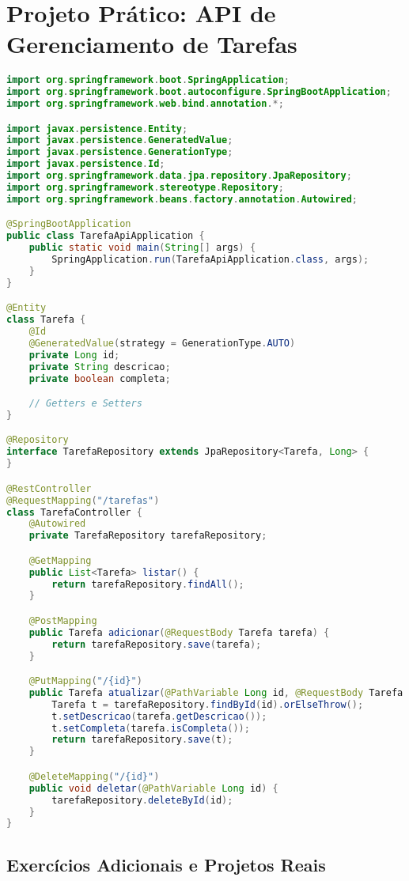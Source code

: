 \documentclass[a4paper,12pt]{book}
\begin{document}
\section{Projeto Prático: API de Gerenciamento de Tarefas}
\begin{lstlisting}[language=Java]
import org.springframework.boot.SpringApplication;
import org.springframework.boot.autoconfigure.SpringBootApplication;
import org.springframework.web.bind.annotation.*;

import javax.persistence.Entity;
import javax.persistence.GeneratedValue;
import javax.persistence.GenerationType;
import javax.persistence.Id;
import org.springframework.data.jpa.repository.JpaRepository;
import org.springframework.stereotype.Repository;
import org.springframework.beans.factory.annotation.Autowired;

@SpringBootApplication
public class TarefaApiApplication {
    public static void main(String[] args) {
        SpringApplication.run(TarefaApiApplication.class, args);
    }
}

@Entity
class Tarefa {
    @Id
    @GeneratedValue(strategy = GenerationType.AUTO)
    private Long id;
    private String descricao;
    private boolean completa;

    // Getters e Setters
}

@Repository
interface TarefaRepository extends JpaRepository<Tarefa, Long> {
}

@RestController
@RequestMapping("/tarefas")
class TarefaController {
    @Autowired
    private TarefaRepository tarefaRepository;

    @GetMapping
    public List<Tarefa> listar() {
        return tarefaRepository.findAll();
    }

    @PostMapping
    public Tarefa adicionar(@RequestBody Tarefa tarefa) {
        return tarefaRepository.save(tarefa);
    }

    @PutMapping("/{id}")
    public Tarefa atualizar(@PathVariable Long id, @RequestBody Tarefa tarefa) {
        Tarefa t = tarefaRepository.findById(id).orElseThrow();
        t.setDescricao(tarefa.getDescricao());
        t.setCompleta(tarefa.isCompleta());
        return tarefaRepository.save(t);
    }

    @DeleteMapping("/{id}")
    public void deletar(@PathVariable Long id) {
        tarefaRepository.deleteById(id);
    }
}
\end{lstlisting}

\subsection{Exercícios Adicionais e Projetos Reais}
\end{document}
